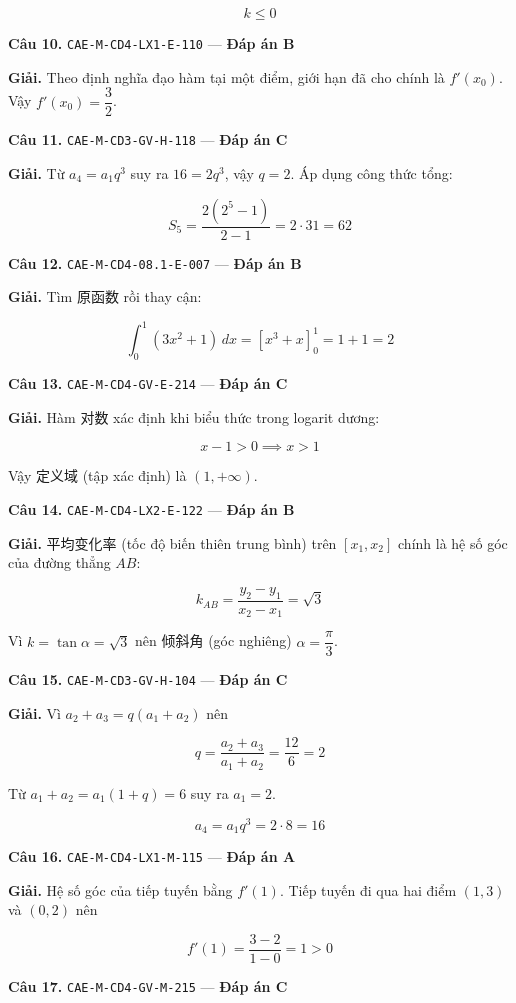 \documentclass[11pt, a4paper]{article}
\begin{document}
$$k \le 0$$

\textbf{Câu 10.} \texttt{CAE-M-CD4-LX1-E-110} — \textbf{Đáp án B}

\textbf{Giải.} Theo định nghĩa đạo hàm tại một điểm, giới hạn đã cho chính là $f'(x_0)$. Vậy $f'(x_0) = \dfrac{3}{2}$.

\textbf{Câu 11.} \texttt{CAE-M-CD3-GV-H-118} — \textbf{Đáp án C}

\textbf{Giải.} Từ $a_4 = a_1 q^3$ suy ra $16 = 2q^3$, vậy $q = 2$. Áp dụng công thức tổng:

$$S_5 = \frac{2(2^5 - 1)}{2 - 1} = 2 \cdot 31 = 62$$

\textbf{Câu 12.} \texttt{CAE-M-CD4-08.1-E-007} — \textbf{Đáp án B}

\textbf{Giải.} Tìm 原函数 rồi thay cận:

$$\int_0^1 (3x^2 + 1)\,dx = \left[x^3 + x\right]_0^1 = 1 + 1 = 2$$

\textbf{Câu 13.} \texttt{CAE-M-CD4-GV-E-214} — \textbf{Đáp án C}

\textbf{Giải.} Hàm 对数 xác định khi biểu thức trong logarit dương:

$$x - 1 > 0 \implies x > 1$$

Vậy 定义域 (tập xác định) là $(1, +\infty)$.

\textbf{Câu 14.} \texttt{CAE-M-CD4-LX2-E-122} — \textbf{Đáp án B}

\textbf{Giải.} 平均变化率 (tốc độ biến thiên trung bình) trên $[x_1, x_2]$ chính là hệ số góc của đường thẳng $AB$:

$$k_{AB} = \frac{y_2 - y_1}{x_2 - x_1} = \sqrt{3}$$

Vì $k = \tan\alpha = \sqrt{3}$ nên 倾斜角 (góc nghiêng) $\alpha = \dfrac{\pi}{3}$.

\textbf{Câu 15.} \texttt{CAE-M-CD3-GV-H-104} — \textbf{Đáp án C}

\textbf{Giải.} Vì $a_2 + a_3 = q(a_1 + a_2)$ nên

$$q = \frac{a_2 + a_3}{a_1 + a_2} = \frac{12}{6} = 2$$

Từ $a_1 + a_2 = a_1(1 + q) = 6$ suy ra $a_1 = 2$.

$$a_4 = a_1 q^3 = 2 \cdot 8 = 16$$

\textbf{Câu 16.} \texttt{CAE-M-CD4-LX1-M-115} — \textbf{Đáp án A}

\textbf{Giải.} Hệ số góc của tiếp tuyến bằng $f'(1)$. Tiếp tuyến đi qua hai điểm $(1, 3)$ và $(0, 2)$ nên

$$f'(1) = \frac{3 - 2}{1 - 0} = 1 > 0$$

\textbf{Câu 17.} \texttt{CAE-M-CD4-GV-M-215} — \textbf{Đáp án C}
\end{document}
